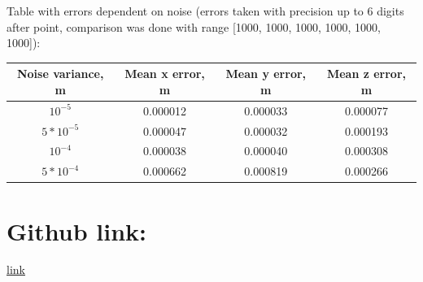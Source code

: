 \documentclass[12pt]{article}
\begin{document}
	Table with errors dependent on noise (errors taken with precision up to 6 digits after point, comparison was done with range [1000, 1000, 1000, 1000, 1000, 1000]): \\
	\begin{tabular}{|c| |c| |c| |c|}
		\hline
		Noise variance, m & Mean x error, m  & Mean y error, m & Mean z error, m \\
		\hline
		$10^{-5}$ &  0.000012 & 0.000033 & 0.000077\\
		\hline
		$5 * 10^{-5}$ & 0.000047 & 0.000032 & 0.000193 \\
		\hline
		$10^{-4}$ & 0.000038 & 0.000040 & 0.000308 \\
		\hline
		$5 * 10^{-4}$ & 0.000662 & 0.000819 & 0.000266 \\
		\hline
	\end{tabular}

	\section{Github link:} 
	\href{https://github.com/jenamax/Robotics_Systems/tree/master/Homework2}{\underline{link}}
\end{document}

